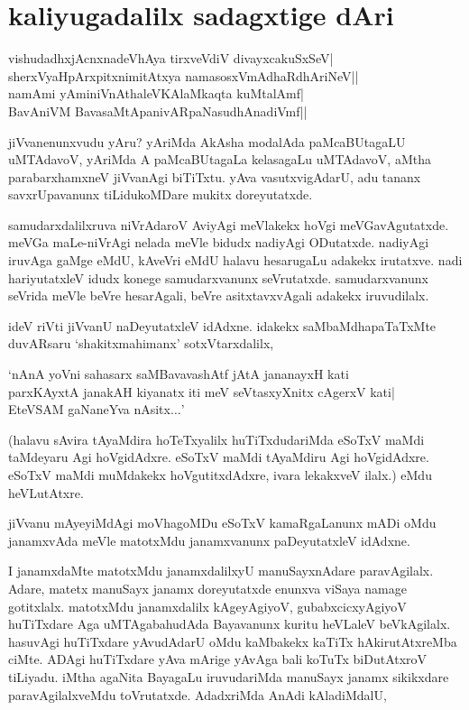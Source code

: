  \chapter{kaliyugadalilx sadagxtige dAri} 

\begin{shloka}
vishudadhxjAcnxnadeVhAya tirxveVdiV divayxcakuSxSeV|\\
sherxVyaHpArxpitxnimitAtxya namasosxVmAdhaRdhAriNeV||\\
namAmi yAminiVnAthaleVKAlaMkaqta kuMtalAmf|\\
BavAniVM BavasaMtApanivARpaNasudhAnadiVmf||
\end{shloka}

jiVvanenunxvudu yAru? yAriMda AkAsha modalAda paMcaBUtagaLU uMTAdavoV, yAriMda A paMcaBUtagaLa kelasagaLu uMTAdavoV, aMtha parabarxhamxneV jiVvanAgi biTiTxtu. yAva vasutxvigAdarU, adu tananx savxrUpavanunx tiLidukoMDare mukitx doreyutatxde.

samudarxdalilxruva niVrAdaroV AviyAgi meVlakekx hoVgi meVGavAgutatxde. meVGa maLe-niVrAgi nelada meVle bidudx nadiyAgi ODutatxde. nadiyAgi iruvAga gaMge eMdU, kAveVri eMdU halavu hesarugaLu adakekx irutatxve. nadi hariyutatxleV idudx konege samudarxvanunx seVrutatxde. samudarxvanunx seVrida meVle beVre hesarAgali, beVre asitxtavxvAgali adakekx iruvudilalx.

ideV riVti jiVvanU naDeyutatxleV idAdxne. idakekx saMbaMdhapaTaTxMte duvARsaru `shakitxmahimanx' sotxVtarxdalilx,

\begin{shloka}
`nAnA yoVni sahasarx saMBavavashAtf jAtA jananayxH kati\\
parxKAyxtA janakAH kiyanatx iti meV seVtasxyXnitx cAgerxV kati|\\
EteVSAM gaNaneYva nAsitx$\ldots$'
\end{shloka}

(halavu sAvira tAyaMdira hoTeTxyalilx huTiTxdudariMda eSoTxV maMdi taMdeyaru Agi hoVgidAdxre. eSoTxV maMdi tAyaMdiru Agi hoVgidAdxre. eSoTxV maMdi muMdakekx hoVgutitxdAdxre, ivara lekakxveV ilalx.) eMdu heVLutAtxre.

jiVvanu mAyeyiMdAgi moVhagoMDu eSoTxV kamaRgaLanunx mADi oMdu janamxvAda meVle matotxMdu janamxvanunx paDeyutatxleV idAdxne.

I janamxdaMte matotxMdu janamxdalilxyU manuSayxnAdare paravAgilalx. Adare, matetx manuSayx janamx doreyutatxde enunxva viSaya namage gotitxlalx. matotxMdu janamxdalilx kAgeyAgiyoV, gubabxcicxyAgiyoV huTiTxdare Aga uMTAgabahudAda Bayavanunx kuritu heVLaleV beVkAgilalx. hasuvAgi huTiTxdare yAvudAdarU oMdu kaMbakekx kaTiTx hAkirutAtxreMba ciMte. ADAgi huTiTxdare yAva mArige yAvAga bali koTuTx biDutAtxroV tiLiyadu. iMtha agaNita BayagaLu iruvudariMda manuSayx janamx sikikxdare paravAgilalxveMdu toVrutatxde. AdadxriMda AnAdi kAladiMdalU,


